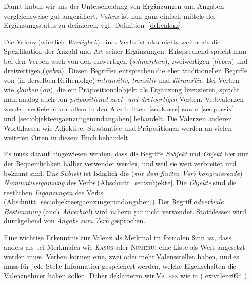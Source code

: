Damit haben wir uns der Unterscheidung von Ergänzungen und Angaben vergleichsweise gut angenähert.
\textit{Valenz} ist nun ganz einfach mittels des Ergänzungsstatus zu definieren, vgl.\ Definition~\ref{def:valenz}.


Die Valenz (wörtlich \textit{Wertigkeit}) eines Verbs ist also nichts weiter als die Spezifikation der Anzahl und Art seiner Ergänzungen.
Entsprechend spricht man bei den Verben auch von den einwertigen (\textit{schnarchen}), zweiwertigen (\textit{lieben}) und dreiwertigen (\textit{geben}).
Diesen Begriffen entsprechen die eher traditionellen Begriffe von (in derselben Reihenfolge) \textit{intransitiv}, \textit{transitiv} und \textit{ditransitiv}.
Bei Verben wie \textit{glauben} (\textit{an}), die ein Präpositionalobjekt als Ergänzung lizenzieren, spricht man analog auch von \textit{präpositional zwei- und dreiwertigen} Verben.\label{abs:valenz093}
Verb\-valenzen werden vertiefend vor allem in den Abschnitten~\ref{sec:kasus} sowie~\ref{sec:passiv} und~\ref{sec:objekteergaenzungenundangaben} behandelt.
Die Valenzen anderer Wortklassen wie Adjektive, Substantive und Präpositionen werden an vielen weiteren Orten in diesem Buch behandelt.

Es muss darauf hingewiesen werden, dass die Begriffe \textit{Subjekt} und \textit{Objekt} hier nur der Bequemlichkeit halber verwendet werden, und weil sie weit verbreitet und bekannt sind.
Das \textit{Subjekt} ist lediglich die (\textit{mit dem finiten Verb kongruierende}) \textit{Nominativergänzung} des Verbs (Abschnitt~\ref{sec:subjekte}.
Die \textit{Objekte} sind die restlichen \textit{Ergänzungen} des Verbs (Abschnitt~\ref{sec:objekteergaenzungenundangaben}).
Der Begriff \textit{adverbiale Bestimmung} (auch \textit{Adverbial}) wird nahezu gar nicht verwendet.
Stattdessen wird durchgehend von \textit{Angabe zum Verb} gesprochen.


Eine wichtige Erkenntnis zur Valenz als Merkmal im formalen Sinn ist, dass anders als bei Merkmalen wie \textsc{Kasus} oder \textsc{Numerus} eine Liste als Wert angesetzt werden muss.
Verben können \zB eine, zwei oder mehr Valenzstellen haben, und es muss für jede Stelle Information gespeichert werden, welche Eigenschaften die Valenznehmer haben sollen.
Daher deklarieren wir \textsc{Valenz} wie in (\ref{ex:valenz094}).

